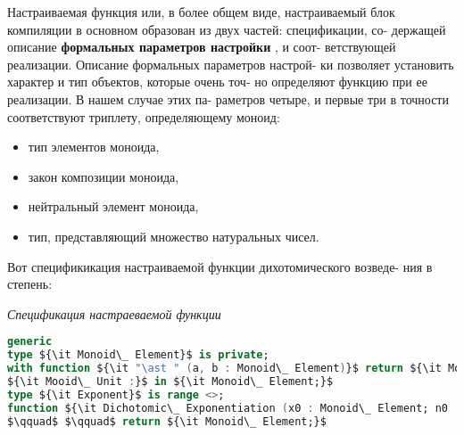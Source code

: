 \noindent Настраиваемая функция или, в более общем виде, настраиваемый блок\linebreak
компиляции в основном образован из двух частей: спецификации, со­-\linebreak
держащей описание {\bf формальных параметров настройки} , и соот­-\linebreak
ветствующей реализации. Описание формальных параметров настрой­-\linebreak
ки позволяет установить характер и тип объектов, которые очень точ­-\linebreak
но определяют функцию при ее реализации. В нашем случае этих па­-\linebreak
раметров четыре, и первые три в точности соответствуют триплету,\linebreak
определяющему моноид:
\begin{itemize}
\item тип элементов моноида,
\item закон композиции моноида,
\item нейтральный элемент моноида,
\item тип, представляющий множество натуральных чисел.
\end{itemize}
\noindent Вот спецификикация настраиваемой функции дихотомического возведе-\linebreak
ния в степень:
\begin{center}
\parbox{8cm}{
{\it {\small Спецификация настраеваемой функции}}}
\end{center}
\begin{lstlisting}[mathescape=true, language=Ada, basicstyle=\small]
generic
type ${\it Monoid\_ Element}$ is private;
with function ${\it "\ast " (a, b : Monoid\_ Element)}$ return ${\it Monoid\_ Element;}$
${\it Mooid\_ Unit :}$ in ${\it Monoid\_ Element;}$
type ${\it Exponent}$ is range <>;
function ${\it Dichotomic\_ Exponentiation (x0 : Monoid\_ Element; n0 : exponent)}$
$\qquad$ $\qquad$ return ${\it Monoid\_ Element;}$
\end{lstlisting}

